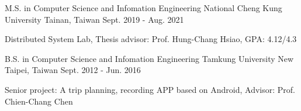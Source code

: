 

\begin{cventries}

  \cventry
    {M.S. in Computer Science and Infomation Engineering} %
    {National Cheng Kung University} %
    {Tainan, Taiwan} %
    {Sept. 2019 - Aug. 2021} %
    {
      \begin{cvitems} %
        \item {Distributed System Lab, Thesis advisor: Prof. Hung-Chang Hsiao, GPA: 4.12/4.3}
      \end{cvitems}
    }

  \cventry
    {B.S. in Computer Science and Infomation Engineering} %
    {Tamkung University} %
    {New Taipei, Taiwan} %
    {Sept. 2012 - Jun. 2016} %
    {
      \begin{cvitems} %
        \item {Senior project: A trip planning, recording APP based on Android, Advisor: Prof. Chien-Chang Chen}
      \end{cvitems}
    }

\end{cventries}
